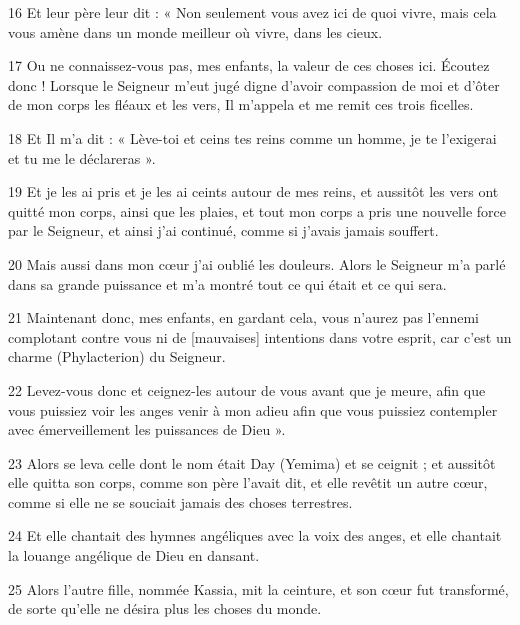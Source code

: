 \par 16 Et leur père leur dit : « Non seulement vous avez ici de quoi vivre, mais cela vous amène dans un monde meilleur où vivre, dans les cieux.

\par 17 Ou ne connaissez-vous pas, mes enfants, la valeur de ces choses ici. Écoutez donc ! Lorsque le Seigneur m'eut jugé digne d'avoir compassion de moi et d'ôter de mon corps les fléaux et les vers, Il m'appela et me remit ces trois ficelles.

\par 18 Et Il m'a dit : « Lève-toi et ceins tes reins comme un homme, je te l'exigerai et tu me le déclareras ».

\par 19 Et je les ai pris et je les ai ceints autour de mes reins, et aussitôt les vers ont quitté mon corps, ainsi que les plaies, et tout mon corps a pris une nouvelle force par le Seigneur, et ainsi j'ai continué, comme si j'avais jamais souffert.

\par 20 Mais aussi dans mon cœur j'ai oublié les douleurs. Alors le Seigneur m'a parlé dans sa grande puissance et m'a montré tout ce qui était et ce qui sera.

\par 21 Maintenant donc, mes enfants, en gardant cela, vous n'aurez pas l'ennemi complotant contre vous ni de [mauvaises] intentions dans votre esprit, car c'est un charme (Phylacterion) du Seigneur.

\par 22 Levez-vous donc et ceignez-les autour de vous avant que je meure, afin que vous puissiez voir les anges venir à mon adieu afin que vous puissiez contempler avec émerveillement les puissances de Dieu ».

\par 23 Alors se leva celle dont le nom était Day (Yemima) et se ceignit ; et aussitôt elle quitta son corps, comme son père l'avait dit, et elle revêtit un autre cœur, comme si elle ne se souciait jamais des choses terrestres.

\par 24 Et elle chantait des hymnes angéliques avec la voix des anges, et elle chantait la louange angélique de Dieu en dansant.

\par 25 Alors l'autre fille, nommée Kassia, mit la ceinture, et son cœur fut transformé, de sorte qu'elle ne désira plus les choses du monde.

